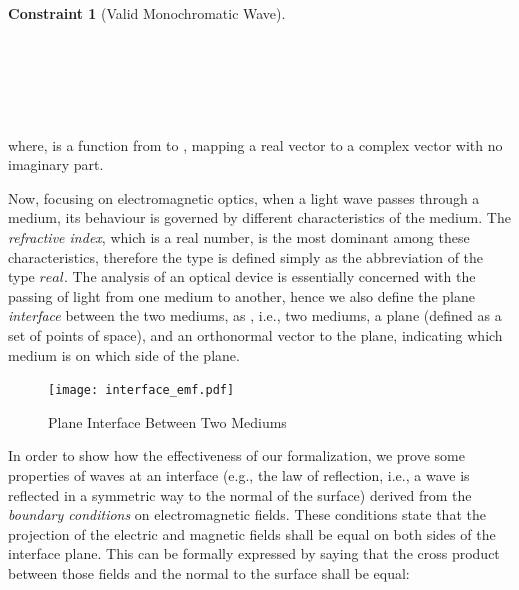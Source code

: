 \documentclass{llncs}
\newtheorem{cons}{Constraint}
\begin{document}
{\begin{cons}[Valid Monochromatic Wave]\ \label{valid_wave} \vspace{.1cm} \\
\\
  \\
   \\
   \\
    \\
\end{cons}

 \noindent where,  is a function from  to , mapping a real vector to a complex vector with no imaginary part.
 
Now, focusing on electromagnetic optics, when a light wave passes through a medium, its behaviour is governed by different characteristics of the medium.
The \emph{refractive index}, which is a real number, is the most dominant among these characteristics,
therefore the type  is defined simply as the abbreviation of the type ${real}$.
The analysis of an optical device is essentially concerned with the passing of light from one medium to another, hence we also define
the plane \emph{interface} between the two mediums, as ,
i.e., two mediums, a plane (defined as a set of points of space), and an orthonormal vector to the plane,
indicating which medium is on which side of the plane.

\begin{figure}[h]
  \centering  \texttt{[image: interface\_emf.pdf]}\ \\
  \caption{Plane Interface Between Two Mediums}\label{fig_interface}
  \vspace{-.2cm}
\end{figure}


In order to show how the effectiveness of our formalization, we prove some properties of waves at an interface
(e.g., the law of reflection, i.e., a wave is reflected in a symmetric way to the normal of the surface)
derived from the \emph{boundary conditions} on electromagnetic fields.
These conditions state that the projection of the electric and magnetic fields shall be equal on both sides of the interface plane.
This can be formally expressed by saying that the cross product between those fields and the normal to the surface shall be equal:

}
\end{document}

